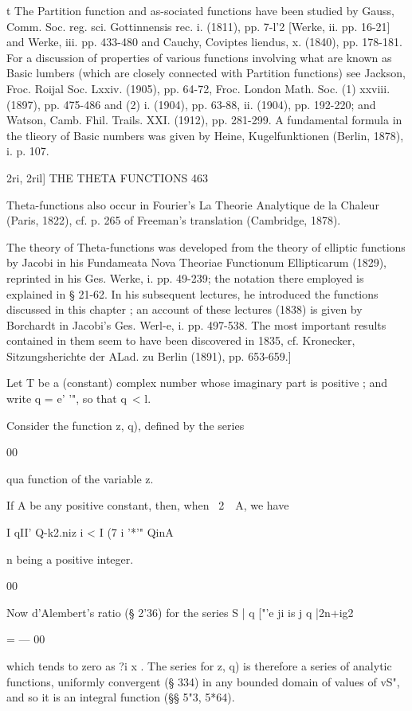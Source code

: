 t The Partition function and as-sociated functions have been studied by Gauss, Comm. Soc. 
reg. sci. Gottinnensis rec. i. (1811), pp. 7-l'2 [Werke, ii. pp. 16-21] and Werke, iii. pp. 433-480 and 
Cauchy, Coviptes liendus, x. (1840), pp. 178-181. For a discussion of properties of various functions 
involving what are known as Basic  lumbers (which are closely connected with Partition functions) 
see Jackson, Froc. Roijal Soc. Lxxiv. (1905), pp. 64-72, Froc. London Math. Soc. (1) xxviii. (1897), 
pp. 475-486 and (2) i. (1904), pp. 63-88, ii. (1904), pp. 192-220; and Watson, Camb. Fhil. Trails. 
XXI. (1912), pp. 281-299. A fundamental formula in the tlieory of Basic numbers was given by 
Heine, Kugelfunktionen (Berlin, 1878), i. p. 107. 



2ri, 2ril] THE THETA FUNCTIONS 463 

Theta-functions also occur in Fourier's La Theorie Analytique de la Chaleur (Paris, 
1822), cf. p. 265 of Freeman's translation (Cambridge, 1878). 

The theory of Theta-functions was developed from the theory of elliptic functions 
by Jacobi in his Fundameata Nova Theoriae Functionum Ellipticarum (1829), reprinted 
in his Ges. Werke, i. pp. 49-239; the notation there employed is explained in § 21-62. 
In his subsequent lectures, he introduced the functions discussed in this chapter ; an 
account of these lectures (1838) is given by Borchardt in Jacobi's Ges. Werl-e, i. pp. 497-538. 
The most important results contained in them seem to have been discovered in 1835, 
cf. Kronecker, Sitzungsherichte der ALad. zu Berlin (1891), pp. 653-659.] 

Let T be a (constant) complex number whose imaginary part is positive ; 
and write q = e' '", so that q\ < l. 

Consider the function   z, q), defined by the series 

00 

qua function of the variable z. 

If A be any positive constant, then, when \ 2\ \  A, we have 

I qII' Q-k2.niz i < I (7 i '*'" QinA 

n being a positive integer. 

00 

Now d'Alembert's ratio (§ 2'36) for the series S | q ["'e ji  is j q |2n+ig2  

  = — 00 

which tends to zero as ?i   x . The series for    z, q) is therefore a series of 
analytic functions, uniformly convergent (§ 334) in any bounded domain of 
values of vS", and so it is an integral function (§§ 5"3, 5*64). 

